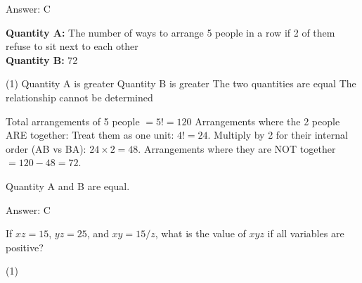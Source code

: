 \documentclass[11pt,paper=a4,answers]{exam}
\begin{document}
\begin{questions}
\begin{solution}
Answer: \colorbox{yellow!100}{C}
\end{solution}

\vspace{1cm}

\question
\textbf{Quantity A: } The number of ways to arrange 5 people in a row if 2 of them refuse to sit next to each other \\
\vspace{5pt}
\textbf{Quantity B: } 72

\begin{tasks}(1)
\task[A)] Quantity A is greater
\task[B)] Quantity B is greater
\task[C)] The two quantities are equal
\task[D)] The relationship cannot be determined
\end{tasks}

\begin{solution}
\begin{center}
Total arrangements of 5 people $= 5! = 120$
\vspace{5pt}
Arrangements where the 2 people ARE together:
\vspace{5pt}
Treat them as one unit: $4! = 24$.
\vspace{5pt}
Multiply by 2 for their internal order (AB vs BA): $24 \times 2 = 48$.
\vspace{5pt}
Arrangements where they are NOT together $= 120 - 48 = 72$.
\end{center}
\vspace{5pt}
Quantity A and B are equal.

Answer: \colorbox{yellow!100}{C}
\end{solution}

\vspace{1cm}


\question
If $xz = 15$, $yz = 25$, and $xy = 15/z$, what is the value of $xyz$ if all variables are positive?

\begin{tasks}(1)
    
\end{tasks}


\end{questions}
\end{document}
